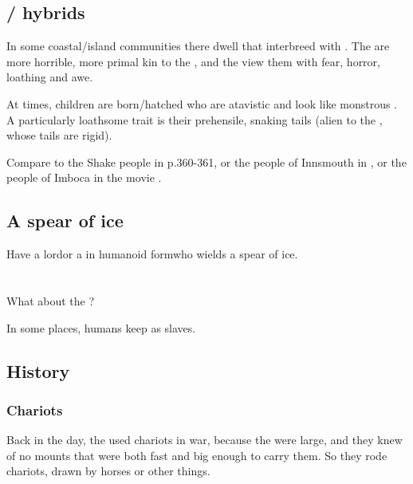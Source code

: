 \subsection{\Scatha/\naga{} hybrids}
\label{Naga-Scatha hybrids}
\label{Scatha-Naga hybrids}
In some coastal/island communities there dwell \scathae{} that interbreed with \nagae{}. The \nagae{} are more horrible, more primal kin to the \scathae, and the \scathae{} view them with fear, horror, loathing and awe. 

At times, children are born/hatched who are atavistic and look like monstrous \nagae. A particularly loathsome trait is their prehensile, snaking tails (alien to the \scathae, whose tails are rigid).

Compare to the Shake people in \SEReapersGale{} p.360-361, or the people of Innsmouth in , or the people of Imboca in the movie . 







\subsection{A spear of ice}
Have a \naga{} lord\dash or a \vlekkeshsal{} in humanoid form\dash who wields a spear of ice. 















\section{\Nephilim}
What about the \nephilim?

In some places, humans keep \nephilim{} as slaves. 







\subsection{History}
\subsubsection{Chariots}
Back in the day, the \nephilim{} used chariots in war, because the \nephilim{} were large, and they knew of no mounts that were both fast and big enough to carry them. So they rode chariots, drawn by horses or other things.







